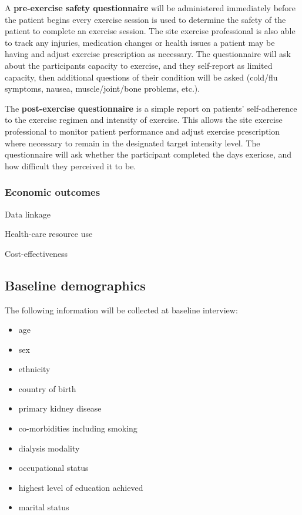 \documentclass[
]{article}
\providecommand{\tightlist}{%
  \setlength{\itemsep}{0pt}\setlength{\parskip}{0pt}}
\begin{document}
A \textbf{pre-exercise safety questionnaire} will be administered immediately before the patient begins every exercise session is used to determine the safety of the patient to complete an exercise session. The site exercise professional is also able to track any injuries, medication changes or health issues a patient may be having and adjust exercise prescription as necessary.
The questionnaire will ask about the participants capacity to exercise, and they self-report as limited capacity, then additional questions of their condition will be asked (cold/flu symptoms, nausea, muscle/joint/bone problems, etc.).

The \textbf{post-exercise questionnaire} is a simple report on patients’ self-adherence to the exercise regimen and intensity of exercise. This allows the site exercise professional to monitor patient performance and adjust exercise prescription where necessary to remain in the designated target intensity level.
The questionnaire will ask whether the participant completed the days exericse, and how difficult they perceived it to be.

\hypertarget{economic-outcomes}{
  \subsubsection{Economic outcomes}\label{economic-outcomes}}

Data linkage

Health-care resource use
  
Cost-effectiveness


\hypertarget{baseline}{
  \subsection{Baseline demographics}\label{baseline}}

The following information will be collected at baseline interview:

\begin{itemize}
  \tightlist
  \item age
  \item sex
  \item ethnicity
  \item country of birth
  \item primary kidney disease
  \item co-morbidities including smoking
  \item dialysis modality
  \item occupational status
  \item highest level of education achieved
  \item marital status
\end{itemize}
\end{document}
